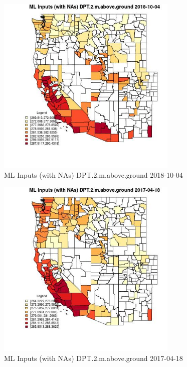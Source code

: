 \begin{figure} 
\centering  
\includegraphics[width=0.77\textwidth]{Code_Outputs/Report_ML_input_PM25_Step4_part_f_de_duplicated_aveswNAs_CountyDPT2mabovegroundMean2018-10-04.jpg} 
\caption{\label{fig:Report_ML_input_PM25_Step4_part_f_de_duplicated_aveswNAsCountyDPT2mabovegroundMean2018-10-04}ML Inputs (with NAs) DPT.2.m.above.ground 2018-10-04} 
\end{figure} 
 

\begin{figure} 
\centering  
\includegraphics[width=0.77\textwidth]{Code_Outputs/Report_ML_input_PM25_Step4_part_f_de_duplicated_aveswNAs_CountyDPT2mabovegroundMean2017-04-18.jpg} 
\caption{\label{fig:Report_ML_input_PM25_Step4_part_f_de_duplicated_aveswNAsCountyDPT2mabovegroundMean2017-04-18}ML Inputs (with NAs) DPT.2.m.above.ground 2017-04-18} 
\end{figure} 
 

